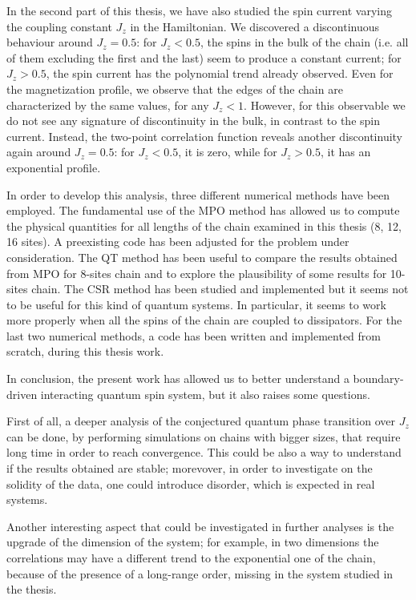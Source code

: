 In the second part of this thesis, we have also studied the spin current varying the coupling constant $J_z$ in the Hamiltonian. We discovered a discontinuous behaviour around $J_z = 0.5$: for $J_z < 0.5$, %
the spins in the bulk of the chain (i.e. all of them excluding the first and the last) seem to produce a constant current; for $J_z > 0.5$, the spin current has the polynomial trend already observed. Even for the magnetization profile, we observe that the edges of the chain are characterized by the same values, for any $J_z<1$. However, for this observable we do not see any signature of discontinuity in the bulk, in contrast to the spin current. Instead, the two-point correlation function reveals another discontinuity again around $J_z = 0.5$: for $J_z < 0.5$, it is zero, while for $J_z > 0.5$, it has an exponential profile.

In order to develop this analysis, three different numerical methods have been employed.  The fundamental use of the MPO method has allowed us to compute the physical quantities for all lengths of the chain examined in this thesis (8, 12, 16 sites). A preexisting code has been adjusted for the problem under consideration. The QT method has been useful to compare the results obtained from MPO for 8-sites chain and to explore the plausibility of some results for 10-sites chain. The CSR method has been studied and implemented but it seems not to be useful for this kind of quantum systems. In particular, it seems to work more properly when all the spins of the chain are coupled to dissipators. For the last two numerical methods, a code has been written and implemented from scratch, during this thesis work.

In conclusion, the present work has allowed us to better understand a boundary-driven interacting quantum spin system, but it also raises some questions.

First of all, a deeper analysis of the conjectured quantum phase transition over $J_z$ can be done, by performing simulations on chains with bigger sizes, that require long time in order to reach convergence. This could be also a way to understand if the results obtained are stable; morevover, in order to investigate on the solidity of the data, one could introduce disorder, which is expected in real systems. 

Another interesting aspect that could be investigated in further analyses is the upgrade of the dimension of the system; for example, in two dimensions the correlations may have a different trend to the exponential one of the chain, because of the presence of a long-range order, missing in the system studied in the thesis. 


